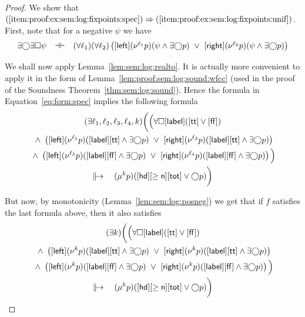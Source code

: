 \documentclass[%
  a4paper,
  UKenglish,
  cleveref,
  autoref,
  thm-restate,
  numberwithinsect,
]{lipics-v2021}
\newcommand\imp\Rightarrow
\newcommand\defthesisiff{\dashv\vdash}
\newcommand\thesisiff{\mathrel{\defthesisiff}}
\newcommand\Next{\mathord{\bigcirc}}
\renewcommand{\Box}{\square}
\newcommand\term[1]{\mathsf{#1}}
\newcommand\hd{\mathop{\term{hd}}}
\newcommand\lbl{\mathop{\term{label}}}
\newcommand\lft{\mathop{\term{left}}}
\newcommand\rght{\mathop{\term{right}}}
\newcommand\true{\term{tt}}
\newcommand\false{\term{ff}}
\newcommand\defrealto{\mathrel\parallel\joinrel\to}
\newcommand\realto{\mathrel{\defrealto}}
\newcommand\itvar{k}
\newcommand\itvarbis{\ell}
\newcommand\tot{\term{tot}}
\newcommand\FP{p}
\newcommand\finmu{\mu}
\newcommand\finnu{\nu}
\newcommand\form[1]{\lbrack #1 \rbrack}
\begin{document}
\begin{proof}
We show that
\(
  \text{(\ref{item:proof:ex:sem:log:fixpoints:spec})}
  \imp
  \text{(\ref{item:proof:ex:sem:log:fixpoints:unif})}
\).
%
First, note that
for a negative $\psi$
we have
\[
\begin{array}{l l l}
  \exists\Next \exists\Box \psi
& \thesisiff
& (\forall \itvarbis_1)
  (\forall \itvarbis_2)
  \left(
  \form{\lft}(\finnu^{\itvarbis_1} \FP)(\psi \land \exists\Next\FP)
  ~\lor~
  \form{\rght}(\finnu^{\itvarbis_2} \FP)(\psi \land \exists\Next\FP)
  \right)
\end{array}
\]

We shall now apply Lemma~\ref{lem:sem:log:realto}.
It is actually more convenient to apply it in the form of
Lemma~\ref{lem:proof:sem:log:sound:wfcc}
(used in the proof of the Soundness Theorem~\ref{thm:sem:log:sound}).
Hence the formula in Equation~\eqref{eq:form:spec}
implies the following formula
\begin{multline*}
  (\exists \itvarbis_1, \itvarbis_2, \itvarbis_3, \itvarbis_4, \itvar) 
  \bigg(
  \Big(
  \forall\Box\form\lbl(\form\true \lor \form\false)
\\
  ~\land~
  \left(
  \form{\lft}(\finnu^{\itvarbis_1} \FP)(\form\lbl\form\true \land \exists\Next\FP)
  ~\lor~
  \form{\rght}(\finnu^{\itvarbis_2} \FP)(\form\lbl\form\true \land \exists\Next\FP)
  \right)
\\
  ~\land~
  \left(
  \form{\lft}(\finnu^{\itvarbis_3} \FP)(\form\lbl\form\false \land \exists\Next\FP)
  ~\lor~
  \form{\rght}(\finnu^{\itvarbis_4} \FP)(\form\lbl\form\false \land \exists\Next\FP)
  \right)
  \Big)
\\
  \realto\quad
  (\finmu^\itvar \FP)(\form\hd \form{\geq \term n} \form\tot \lor \Next \FP)
  \bigg)
\end{multline*}

But now, by monotonicity
(Lemma~\ref{lem:sem:log:posneg})
we get that if $f$ satisfies the last formula above,
then it also satisfies
\begin{multline*}
  (\exists \itvar) 
  \bigg(
  \Big(
  \forall\Box\form\lbl(\form\true \lor \form\false)
\\
  ~\land~
  \left(
  \form{\lft}(\finnu^{\itvar} \FP)(\form\lbl\form\true \land \exists\Next\FP)
  ~\lor~
  \form{\rght}(\finnu^{\itvar} \FP)(\form\lbl\form\true \land \exists\Next\FP)
  \right)
\\
  ~\land~
  \left(
  \form{\lft}(\finnu^{\itvar} \FP)(\form\lbl\form\false \land \exists\Next\FP)
  ~\lor~
  \form{\rght}(\finnu^{\itvar} \FP)(\form\lbl\form\false \land \exists\Next\FP)
  \right)
  \Big)
\\
  \realto\quad
  (\finmu^\itvar \FP)(\form\hd \form{\geq \term n} \form\tot \lor \Next \FP)
  \bigg)
\end{multline*}


\end{proof}
\end{document}

